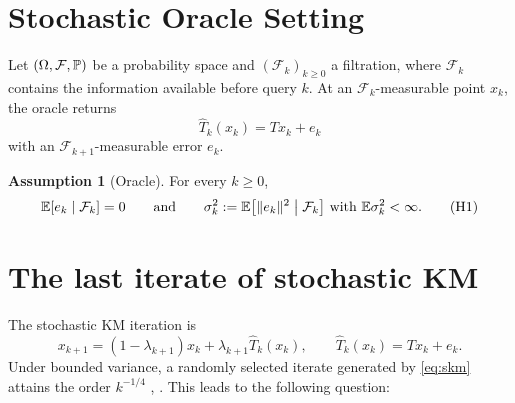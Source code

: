 \documentclass[10pt,draft]{article}
\numberwithin{equation}{section}
\theoremstyle{definition}
\newtheorem{assumption}{Assumption}[section]
\theoremstyle{remark}
\newcommand{\HH}{\RR^d}
\newcommand{\FF}{\mathcal F}
\DeclareMathOperator{\Fix}{Fix}
\newcommand{\norm}[1]{\lVert #1\rVert}
\newcommand{\ip}[2]{\langle #1,#2\rangle}
\begin{document}
\section{Stochastic Oracle Setting}\label{sec:problem}


Let $(\Omega,\FF,\PP)$ be a probability space and $(\FF_k)_{k\geq0}$ a
filtration, where $\FF_k$ contains the information available before query
$k$. At an $\FF_k$-measurable point $x_k$, the oracle returns
\begin{equation}\label{eq:oracle}
 \widehat T_k(x_k)=Tx_k+e_k
\end{equation}
with an $\FF_{k+1}$-measurable error $e_k$.

\begin{assumption}[Oracle]\label{ass:oracle}
For every $k\geq0$,
\begin{equation}\label{eq:h1}
 \EE[e_k\mid\FF_k]=0\qquad\text{and}\qquad
 \sigma_k^2:=\EE\bigl[\norm{e_k}^2\bigm|\FF_k\bigr]
 \ \text{with}\ \EE\sigma_k^2<\infty.
 \tag{H1}
\end{equation}
\end{assumption}

\section{The last iterate of stochastic KM}\label{sec:km}



The stochastic KM iteration is
\begin{equation}\label{eq:skm}
 x_{k+1}=(1-\lambda_{k+1})x_k+\lambda_{k+1}\widehat T_k(x_k),\qquad
 \widehat T_k(x_k)=Tx_k+e_k .
\end{equation}
Under bounded variance, a randomly selected iterate generated by
\eqref{eq:skm} attains the order $k^{-1/4}$
\cite[Corollary~5.4]{bravo2024stochastic}, \cite{cortild2026stochastic}.
This leads to the following question:
\end{document}
